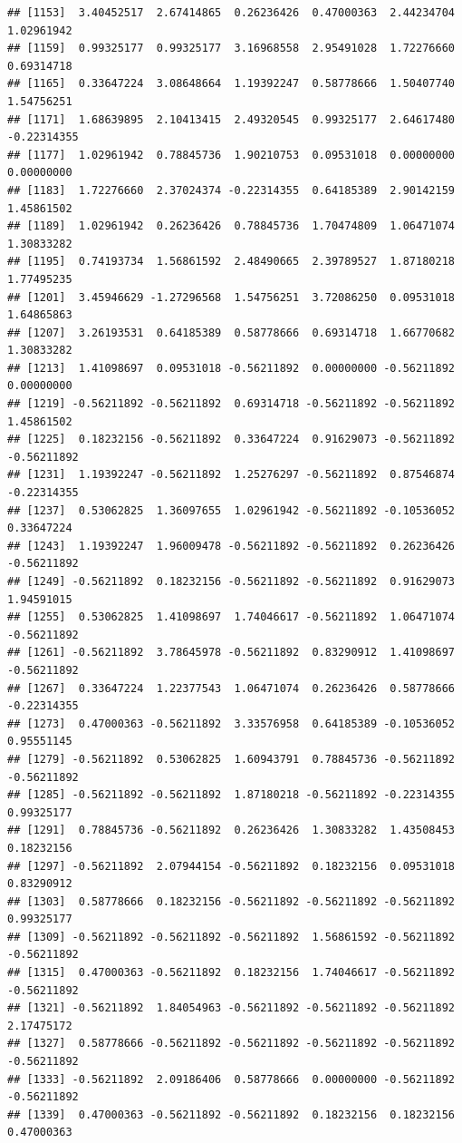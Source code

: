 \documentclass[
]{article}
\begin{document}
\begin{verbatim}
## [1153]  3.40452517  2.67414865  0.26236426  0.47000363  2.44234704  1.02961942
## [1159]  0.99325177  0.99325177  3.16968558  2.95491028  1.72276660  0.69314718
## [1165]  0.33647224  3.08648664  1.19392247  0.58778666  1.50407740  1.54756251
## [1171]  1.68639895  2.10413415  2.49320545  0.99325177  2.64617480 -0.22314355
## [1177]  1.02961942  0.78845736  1.90210753  0.09531018  0.00000000  0.00000000
## [1183]  1.72276660  2.37024374 -0.22314355  0.64185389  2.90142159  1.45861502
## [1189]  1.02961942  0.26236426  0.78845736  1.70474809  1.06471074  1.30833282
## [1195]  0.74193734  1.56861592  2.48490665  2.39789527  1.87180218  1.77495235
## [1201]  3.45946629 -1.27296568  1.54756251  3.72086250  0.09531018  1.64865863
## [1207]  3.26193531  0.64185389  0.58778666  0.69314718  1.66770682  1.30833282
## [1213]  1.41098697  0.09531018 -0.56211892  0.00000000 -0.56211892  0.00000000
## [1219] -0.56211892 -0.56211892  0.69314718 -0.56211892 -0.56211892  1.45861502
## [1225]  0.18232156 -0.56211892  0.33647224  0.91629073 -0.56211892 -0.56211892
## [1231]  1.19392247 -0.56211892  1.25276297 -0.56211892  0.87546874 -0.22314355
## [1237]  0.53062825  1.36097655  1.02961942 -0.56211892 -0.10536052  0.33647224
## [1243]  1.19392247  1.96009478 -0.56211892 -0.56211892  0.26236426 -0.56211892
## [1249] -0.56211892  0.18232156 -0.56211892 -0.56211892  0.91629073  1.94591015
## [1255]  0.53062825  1.41098697  1.74046617 -0.56211892  1.06471074 -0.56211892
## [1261] -0.56211892  3.78645978 -0.56211892  0.83290912  1.41098697 -0.56211892
## [1267]  0.33647224  1.22377543  1.06471074  0.26236426  0.58778666 -0.22314355
## [1273]  0.47000363 -0.56211892  3.33576958  0.64185389 -0.10536052  0.95551145
## [1279] -0.56211892  0.53062825  1.60943791  0.78845736 -0.56211892 -0.56211892
## [1285] -0.56211892 -0.56211892  1.87180218 -0.56211892 -0.22314355  0.99325177
## [1291]  0.78845736 -0.56211892  0.26236426  1.30833282  1.43508453  0.18232156
## [1297] -0.56211892  2.07944154 -0.56211892  0.18232156  0.09531018  0.83290912
## [1303]  0.58778666  0.18232156 -0.56211892 -0.56211892 -0.56211892  0.99325177
## [1309] -0.56211892 -0.56211892 -0.56211892  1.56861592 -0.56211892 -0.56211892
## [1315]  0.47000363 -0.56211892  0.18232156  1.74046617 -0.56211892 -0.56211892
## [1321] -0.56211892  1.84054963 -0.56211892 -0.56211892 -0.56211892  2.17475172
## [1327]  0.58778666 -0.56211892 -0.56211892 -0.56211892 -0.56211892 -0.56211892
## [1333] -0.56211892  2.09186406  0.58778666  0.00000000 -0.56211892 -0.56211892
## [1339]  0.47000363 -0.56211892 -0.56211892  0.18232156  0.18232156  0.47000363

\end{verbatim}
\end{document}
